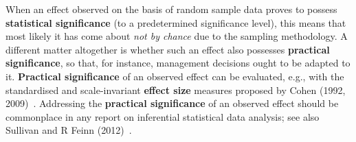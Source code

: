 \medskip
\noindent
When an effect observed on the basis of random sample data proves 
to possess \textbf{statistical signifi\-cance} (to a predetermined 
significance level), this means that most likely it has come about 
\textit{not by chance} due to the sampling methodology. A different 
matter altogether is whether such an effect also possesses
\textbf{practical significance}, so that, for instance, management 
decisions ought to be adapted to it. \textbf{Practical
significance} of an observed effect can be evaluated, e.g., with
the standardised and scale-invariant \textbf{effect size} measures
proposed by Cohen (1992, 2009)~. Addressing
the \textbf{practical significance} of an observed effect should be 
commonplace in any report on inferential statistical data analysis;
see also Sullivan and R Feinn (2012)~.


